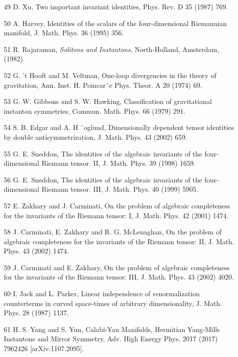 \documentclass{article}
\begin{document}
\begin{itemize}
\item 
[49] D. Xu, Two important invariant identities, Phys. Rev. D 35 (1987) 769.

\item 
[50] A. Harvey, Identities of the scalars of the four-dimensional Riemannian manifold, J. Math. Phys. 36 (1995) 356.

\item 
[51] R. Rajaraman, \textit{Solitons and Instantons}, North-Holland, Amsterdam, (1982).

\item 
[52] G. 't Hooft and M. Veltman, One-loop divergencies in the theory of gravitation, Ann. Inst. H. Poincar´e Phys. Theor. A 20 (1974) 69.

\item 
[53] G. W. Gibbons and S. W. Hawking, Classification of gravitational instanton symmetries, Commun. Math. Phys. 66 (1979) 291.

\item 
[54] S. B. Edgar and A. H ¨oglund, Dimensionally dependent tensor identities by double antisymmetrization, J. Math. Phys. 43 (2002) 659.

\item 
[55] G. E. Sneddon, The identities of the algebraic invariants of the four-dimensional Riemann tensor. II, J. Math. Phys. 39 (1998) 1659.

\item 
[56] G. E. Sneddon, The identities of the algebraic invariants of the four-dimensional Riemann tensor. III, J. Math. Phys. 40 (1999) 5905.

\item 
[57] E. Zakhary and J. Carminati, On the problem of algebraic completeness for the invariants of the Riemann tensor: I, J. Math. Phys. 42 (2001) 1474.

\item 
[58] J. Carminati, E. Zakhary and R. G. McLenaghan, On the problem of algebraic completeness for the invariants of the Riemann tensor: II, J. Math. Phys. 43 (2002) 1474.

\item 
[59] J. Carminati and E. Zakhary, On the problem of algebraic completeness for the invariants of the Riemann tensor: III, J. Math. Phys. 43 (2002) 4020.

\item 
[60] I. Jack and L. Parker, Linear independence of renormalization counterterms in curved space-times of arbitrary dimensionality, J. Math. Phys. 28 (1987) 1137.

\item 
[61] H. S. Yang and S. Yun, Calabi-Yau Manifolds, Hermitian Yang-Mills Instantons and Mirror Symmetry, Adv. High Energy Phys. 2017 (2017) 7962426 [arXiv:1107.2095].

\end{itemize}
\end{document}
